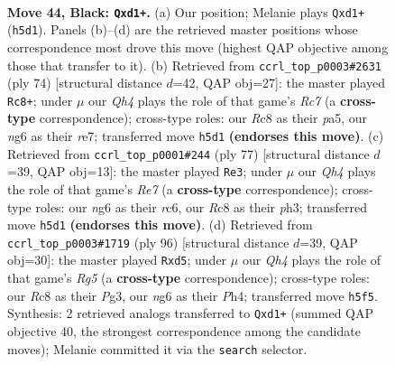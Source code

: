 \documentclass[11pt]{article}
\begin{document}
\clearpage

\begin{figure}[p]\centering
\begin{subfigure}{0.46\textwidth}\centering
\resizebox{\linewidth}{!}{%
\newchessgame
\chessboard[
  setfen={2r3k1/6p1/1p4N1/r2p3q/P3p3/R7/2P2P2/3R2K1 b - - 0 44},
  showmover=false,
  pgfstyle=straightmove, color=movearrow, markmove={h5-d1}
]}
\caption{}
\end{subfigure}\hfill
\begin{subfigure}{0.46\textwidth}\centering
\resizebox{\linewidth}{!}{%
\newchessgame
\chessboard[
  setfen={5k2/2R1rp1p/1p6/p3PR2/r7/7P/2P3P1/6K1 w - - 2 38},
  showmover=false,
  pgfstyle=straightmove, color=movearrow, markmove={c7-c8}
]}
\caption{}
\end{subfigure}
\\[4pt]
\begin{subfigure}{0.46\textwidth}\centering
\resizebox{\linewidth}{!}{%
\newchessgame
\chessboard[
  setfen={8/3r2kp/2R3p1/1p1P4/p7/P6P/1P2r3/1K1R4 b - - 0 39},
  showmover=false,
  pgfstyle=straightmove, color=movearrow, markmove={e2-e3}
]}
\caption{}
\end{subfigure}\hfill
\begin{subfigure}{0.46\textwidth}\centering
\resizebox{\linewidth}{!}{%
\newchessgame
\chessboard[
  setfen={8/4rp1k/8/3p2R1/2r4P/P3p1P1/2P1R3/2K5 w - - 0 49},
  showmover=false,
  pgfstyle=straightmove, color=movearrow, markmove={g5-d5}
]}
\caption{}
\end{subfigure}
\caption{\textbf{Move 44, Black: \texttt{Qxd1+}.} (a) Our position; Melanie plays \texttt{Qxd1+} (\texttt{h5d1}). Panels (b)--(d) are the retrieved master positions whose correspondence most drove this move (highest QAP objective among those that transfer to it). (b) Retrieved from \texttt{ccrl\_top\_p0003\#2631} (ply 74) [structural distance $d$=42, QAP obj=27]: the master played \texttt{Rc8+}; under $\mu$ our \emph{Qh4} plays the role of that game's \emph{Rc7} (a \textbf{cross-type} correspondence); cross-type roles: our \emph{R}c8 as their \emph{p}a5, our \emph{n}g6 as their \emph{r}e7; transferred move \texttt{h5d1} \textbf{(endorses this move)}. (c) Retrieved from \texttt{ccrl\_top\_p0001\#244} (ply 77) [structural distance $d$=39, QAP obj=13]: the master played \texttt{Re3}; under $\mu$ our \emph{Qh4} plays the role of that game's \emph{Re7} (a \textbf{cross-type} correspondence); cross-type roles: our \emph{n}g6 as their \emph{r}c6, our \emph{R}c8 as their \emph{p}h3; transferred move \texttt{h5d1} \textbf{(endorses this move)}. (d) Retrieved from \texttt{ccrl\_top\_p0003\#1719} (ply 96) [structural distance $d$=39, QAP obj=30]: the master played \texttt{Rxd5}; under $\mu$ our \emph{Qh4} plays the role of that game's \emph{Rg5} (a \textbf{cross-type} correspondence); cross-type roles: our \emph{R}c8 as their \emph{P}g3, our \emph{n}g6 as their \emph{P}h4; transferred move \texttt{h5f5}. Synthesis: 2 retrieved analogs transferred to \texttt{Qxd1+} (summed QAP objective 40, the strongest correspondence among the candidate moves); Melanie committed it via the \texttt{search} selector.}
\label{fig:thought-m87}
\end{figure}
\end{document}
